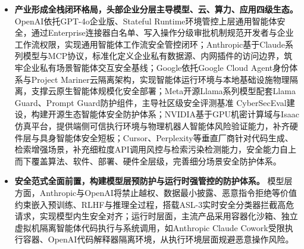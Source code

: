 \begin{itemize}[tabitem]
\item \textbf{产业形成全栈闭环格局，头部企业分层主导模型、云、算力、应用四级生态。}
OpenAI依托GPT-4o企业版、Stateful Runtime环境管控上层通用智能体安全，通过Enterprise连接器白名单、写入操作分级审批机制规范开发者与企业工作流权限，实现通用智能体工作流安全管控闭环\cite{openaichatgptagent2025,openaiagentssdk2026}；Anthropic基于Claude系列模型与MCP协议，标准化定义企业私有数据源、内网插件的访问边界，筑牢企业私有场景智能体交互安全基线\cite{mcpsafetyaudit2025}；Google依托Google Cloud Agent身份体系与Project Mariner云隔离架构，实现智能体运行环境与本地基础设施物理隔离，支撑云原生智能体规模化安全部署\cite{googleagentidentity2026,googletoolgovernance2025}；Meta开源Llama系列模型配套Llama Guard、Prompt Guard防护组件，主导社区级安全评测基准 CyberSecEval建设，构建开源生态智能体安全防护体系；NVIDIA基于GPU机密计算域与Isaac仿真平台，提供端侧可信执行环境与物理机器人智能体风险验证能力，补齐硬件层与具身智能体安全短板\cite{nvidiaconfidentialcomputing2026,nvidiaisaacsim2026}；Cursor、Perplexity等垂直厂商针对代码生成、检索增强场景，补充细粒度API调用风控与检索污染检测能力，安全能力自上而下覆盖算法、软件、部署、硬件全层级，完善细分场景安全防护体系\cite{perplexityenterprise2026,cursorsecurity2026}。

\item \textbf{安全范式全面前置，构建模型层预防护与运行时强管控的防护体系。}
模型层方面，Anthropic与OpenAI将禁止越权、数据最小披露、恶意指令拒绝等价值约束嵌入预训练、RLHF与推理全过程，搭载ASL-3实时安全分类器拦截高危请求，实现模型内生安全对齐\cite{openaichatgptagentsystemcard2025}；运行时层面，主流产品采用容器化沙箱、独立虚拟机隔离智能体代码执行与系统调用，如Anthropic Claude Cowork受限执行容器、OpenAI代码解释器隔离环境，从执行环境层面规避恶意操作风险\cite{anthropiccomputeruse2026,openaiagentkit2025}。


\end{itemize}
